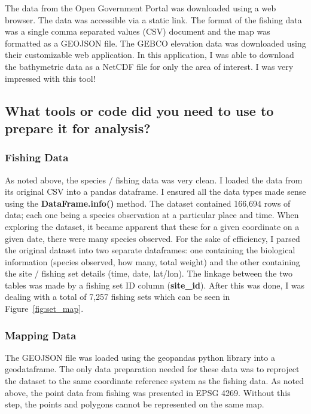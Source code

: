 The data from the Open Government Portal was downloaded using a web browser.
The data was accessible via a static link.
The format of the fishing data was a single comma separated values (CSV) document and the map was formatted as a GEOJSON file.
The GEBCO elevation data was downloaded using their customizable web application.
In this application, I was able to download the bathymetric data as a NetCDF file for only the area of interest.
I was very impressed with this tool!


\subsection{What tools or code did you need to use to prepare it for analysis?}


\subsubsection{Fishing Data}

As noted above, the species / fishing data was very clean.
I loaded the data from its original CSV into a pandas dataframe.
I ensured all the data types made sense using the \textbf{DataFrame.info()} method.
The dataset contained 166,694 rows of data; each one being a species observation at a particular place and time.
When exploring the dataset, it became apparent that these for a given coordinate on a given date, there were many species observed.
For the sake of efficiency, I parsed the original dataset into two separate dataframes:
one containing the biological information (species observed, how many, total weight)
and the other containing the site / fishing set details (time, date, lat/lon).
The linkage between the two tables was made by a fishing set ID column (\textbf{site\_id}).
After this was done, I was dealing with a total of 7,257 fishing sets which can be seen in Figure~\ref{fig:set_map}.

\subsubsection{Mapping Data}

The GEOJSON file was loaded using the geopandas python library into a geodataframe.
The only data preparation needed for these data was to reproject the dataset to the same coordinate reference system as the fishing data.
As noted above, the point data from fishing was presented in EPSG 4269.
Without this step, the points and polygons cannot be represented on the same map.


